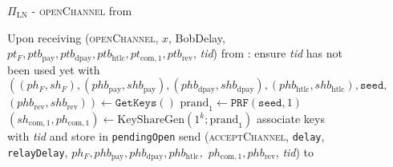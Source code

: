   \begin{figure}[H]
    \begin{protocolbox}{$\Pi_{\mathrm{LN}}$ - \textsc{openChannel} from \bob}
      \begin{algorithmic}[1]
        \State Upon receiving (\textsc{openChannel}, $x$, BobDelay, $pt_F,
        ptb_{\mathrm{pay}}, ptb_{\mathrm{dpay}}, ptb_{\mathrm{htlc}},
        pt_{\mathrm{com}, 1}, ptb_{\mathrm{rev}}$, \textit{tid}) from \bob:
        \Indent
          \State ensure \textit{tid} has not been used yet with \bob
          \State $\left(\left(ph_F, sh_F\right), \left(phb_{\mathrm{pay}},
          shb_{\mathrm{pay}}\right), \left(phb_{\mathrm{dpay}},
          shb_{\mathrm{dpay}}\right), \left(phb_{\mathrm{htlc}},
          shb_{\mathrm{htlc}}\right), \mathtt{seed},\right.$
          $\left.\left(phb_{\mathrm{rev}}, shb_{\mathrm{rev}}\right)\right)
          \gets \texttt{GetKeys}\left(\right)$
          \State $\mathrm{prand}_1 \gets \texttt{PRF}\left(\mathtt{seed},
          1\right)$
          \State $\left(sh_{\mathrm{com}, 1}, ph_{\mathrm{com}, 1}\right) \gets
          \mathrm{KeyShareGen}\left(1^k; \mathrm{prand}_1\right)$
          \State associate keys with \textit{tid} and store in
          \texttt{pendingOpen}
          \label{alg:protocol:open:openChannel:pendingOpen}
          \State send (\textsc{acceptChannel}, \texttt{delay},
          \texttt{relayDelay}, $ph_F, phb_{\mathrm{pay}}, phb_{\mathrm{dpay}},
          phb_{\mathrm{htlc}},$ $ph_{\mathrm{com}, 1}, phb_{\mathrm{rev}}$,
          \textit{tid}) to \bob{}
        \EndIndent
      \end{algorithmic}
    \end{protocolbox}
    \caption{}
    \label{alg:protocol:open:openChannel}
  \end{figure}


